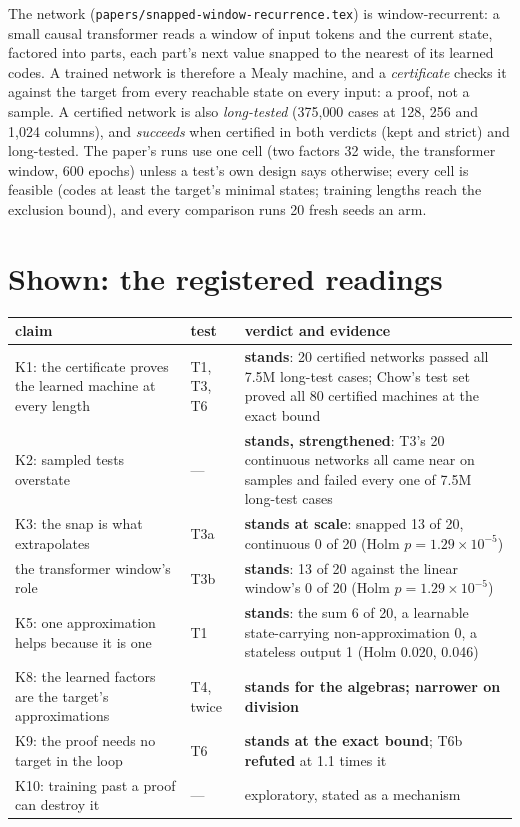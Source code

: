 \documentclass[11pt]{article}
\begin{document}
The network (\texttt{papers/snapped-window-recurrence.tex}) is window-recurrent: a small causal
transformer reads a window of input tokens and the current state, factored into parts, each part's
next value snapped to the nearest of its learned codes. A trained network is therefore a Mealy
machine, and a \emph{certificate} checks it against the target from every reachable state on every
input: a proof, not a sample. A certified network is also \emph{long-tested} (375{,}000 cases at
128, 256 and 1{,}024 columns), and \emph{succeeds} when certified in both verdicts (kept and strict)
and long-tested. The paper's runs use one cell (two factors 32 wide, the transformer window, 600
epochs) unless a test's own design says otherwise; every cell is feasible (codes at least the
target's minimal states; training lengths reach the exclusion bound), and every comparison runs 20
fresh seeds an arm.

\section{Shown: the registered readings}

\begin{center}
\small
\begin{tabular}{p{}lp{}}
\toprule
claim & test & verdict and evidence \\
\midrule
K1: the certificate proves the learned machine at every length & T1, T3, T6 &
\textbf{stands}: 20 certified networks passed all 7.5M long-test cases; Chow's test set proved all 80
certified machines at the exact bound \\
K2: sampled tests overstate & --- & \textbf{stands, strengthened}: T3's 20 continuous networks all came
near on samples and failed every one of 7.5M long-test cases \\
K3: the snap is what extrapolates & T3a & \textbf{stands at scale}: snapped 13 of 20, continuous 0 of 20
(Holm $p = 1.29\times10^{-5}$) \\
the transformer window's role & T3b & \textbf{stands}: 13 of 20 against the linear window's 0 of 20
(Holm $p = 1.29\times10^{-5}$) \\
K5: one approximation helps because it is one & T1 & \textbf{stands}: the sum 6 of 20, a learnable
state-carrying non-approximation 0, a stateless output 1 (Holm 0.020, 0.046) \\
K8: the learned factors are the target's approximations & T4, twice & \textbf{stands for the
algebras; narrower on division} \\
K9: the proof needs no target in the loop & T6 & \textbf{stands at the exact bound}; T6b
\textbf{refuted} at 1.1 times it \\
K10: training past a proof can destroy it & --- & exploratory, stated as a mechanism \\
\bottomrule
\end{tabular}
\end{center}
\end{document}

